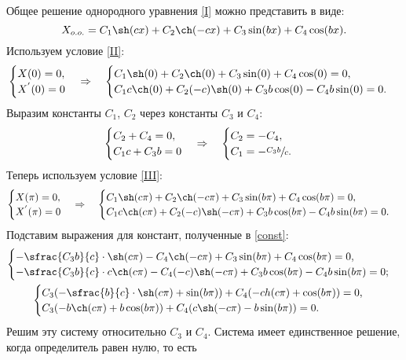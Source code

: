 \documentclass[12pt, a4paper]{article}
\begin{document}
Общее решение однородного уравнения \eqref{I} можно представить в виде:
\[
X_{o.o.}=C_1 \sh(cx) + C_2\ch (-cx) + C_3\sin(bx) + C_4\cos(bx).
\]
Используем условие \eqref{II}:
\[
\begin{cases}
	X(0)=0, \\
	X^{'}(0)=0
\end{cases} \Rightarrow \quad
\begin{cases}
C_1 \sh(0) + C_2\ch (0) + C_3\sin(0) + C_4\cos(0) =0, \\
C_1c\ch(0) + C_2(-c)\sh (0) + C_3 b\cos(0) - C_4 b \sin(0)=0.
\end{cases}
\]
Выразим константы $C_1$, $C_2$ через константы $C_3$ и $C_4$:
\begin{equation}
\begin{cases}
C_2 + C_4 =0, \\
C_1 c + C_3 b =0
\end{cases}  \Rightarrow \quad
\begin{cases}
C_2 =- C_4, \\
C_1 =-\sfrac{C_3 b}{c}.
\end{cases} \label{const}
\end{equation}
Теперь используем условие \eqref{III}:
\[
\begin{cases}
X(\pi)=0, \\
X^{'}(\pi)=0
\end{cases} \Rightarrow \quad
\begin{cases}
C_1 \sh(c\pi) + C_2\ch (-c\pi) + C_3\sin(b\pi) + C_4\cos(b\pi) =0, \\
C_1c\ch(c\pi) + C_2(-c)\sh (-c\pi) + C_3 b\cos(b\pi) - C_4 b \sin(b\pi)=0.
\end{cases}
\]
Подставим выражения для констант, полученные в \eqref{const}:
\begin{gather*}
\begin{cases}
-\sfrac{C_3 b}{c}\cdot \sh(c\pi) - C_4\ch (-c\pi) + C_3\sin(b\pi) + C_4\cos(b\pi) =0, \\
-\sfrac{C_3 b}{c}\cdot c\ch(c\pi) - C_4(-c)\sh (-c\pi) + C_3 b\cos(b\pi) - C_4 b \sin(b\pi)=0;
\end{cases} \\
\begin{cases}
C_3(-\sfrac{b}{c}\cdot \sh(c\pi) +\sin(b\pi))+C_4(-ch(c\pi)+\cos(b\pi)) =0, \\
C_3(-b\ch(c\pi)+b\cos(b\pi)) + C_4(c\sh(-c\pi)-b\sin(b\pi))=0.
\end{cases} 
\end{gather*}
Решим эту систему относительно $C_3$ и $C_4$. Система имеет единственное решение, когда определитель равен нулю, то есть
\end{document}
